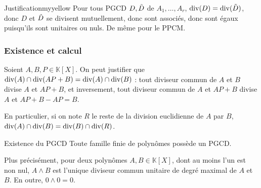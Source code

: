     \begin{demo}{Justification}{myyellow}
        Pour tous PGCD $D, \Tilde{D}$ de $A_1, \ldots, A_r$, $\operatorname{div}(D) = \operatorname{div}(\Tilde{D})$, donc $D$ et $\Tilde{D}$ se divisent mutuellement, donc sont associés, donc sont égaux puisqu’ils sont unitaires ou nuls. De même pour le PPCM.
    \end{demo}

    \subsubsection{Existence et calcul}

    Soient $A,B,P \in \mathbb{K}[X]$. On peut justifier que $\operatorname{div}(A) \cap \operatorname{div}(AP + B) = \operatorname{div}(A) \cap \operatorname{div}(B)$ : tout diviseur commun de $A$ et $B$ divise $A$ et $AP + B$, et inversement, tout diviseur commun de $A$ et $AP+B$ divise $A$ et $AP+B - AP= B$.

    En particulier, si on note $R$ le reste de la division euclidienne de $A$ par $B$, $\operatorname{div}(A) \cap \operatorname{div}(B) = \operatorname{div}(B) \cap \operatorname{div}(R)$.

    \begin{theo}{Existence du PGCD}{}
        Toute famille finie de polynômes possède un PGCD.

        Plus précisément, pour deux polynômes $A,B \in \mathbb{K}[X]$, dont au moins l’un est non nul, $A \wedge B$ est l’unique diviseur commun unitaire de degré maximal de $A$ et $B$. En outre, $0 \wedge 0 = 0$.
    \end{theo}

